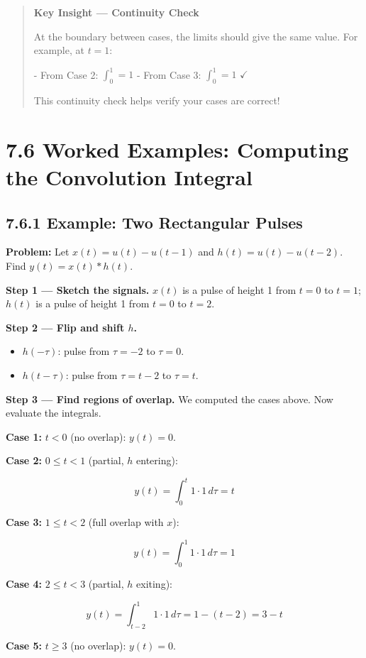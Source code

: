 \documentclass[11pt]{article}
\begin{document}
\begin{quote}
\textbf{Key Insight — Continuity Check}

At the boundary between cases, the limits should give the same value. For example, at $t=1$:

- From Case 2: $\int_0^1 = 1$
- From Case 3: $\int_0^1 = 1$ $\checkmark$

This continuity check helps verify your cases are correct!
\end{quote}

\section*{7.6 Worked Examples: Computing the Convolution Integral}

\subsection*{7.6.1 Example: Two Rectangular Pulses}

\textbf{Problem:} Let $x(t) = u(t) - u(t-1)$ and $h(t) = u(t) - u(t-2)$. Find $y(t) = x(t)*h(t)$.

\textbf{Step 1 — Sketch the signals.} $x(t)$ is a pulse of height 1 from $t=0$ to $t=1$; $h(t)$ is a pulse of height 1 from $t=0$ to $t=2$.

\textbf{Step 2 — Flip and shift $h$.}

\begin{itemize}
  \item $h(-\tau)$: pulse from $\tau = -2$ to $\tau = 0$.
  \item $h(t-\tau)$: pulse from $\tau = t-2$ to $\tau = t$.
\end{itemize}

\textbf{Step 3 — Find regions of overlap.} We computed the cases above. Now evaluate the integrals.

\textbf{Case 1:} $t < 0$ (no overlap): $y(t) = 0$.

\textbf{Case 2:} $0 \leq t < 1$ (partial, $h$ entering):

\[y(t) = \int_0^t 1\cdot 1\,d\tau = t\]

\textbf{Case 3:} $1 \leq t < 2$ (full overlap with $x$):

\[y(t) = \int_0^1 1\cdot 1\,d\tau = 1\]

\textbf{Case 4:} $2 \leq t < 3$ (partial, $h$ exiting):

\[y(t) = \int_{t-2}^1 1\cdot 1\,d\tau = 1 - (t-2) = 3-t\]

\textbf{Case 5:} $t \geq 3$ (no overlap): $y(t) = 0$.
\end{document}
